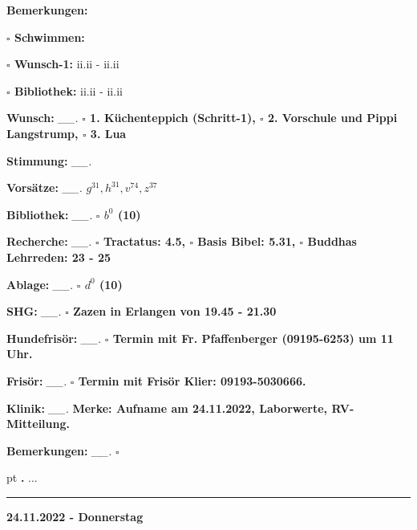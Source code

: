 \documentclass[10pt,a4paper]{article}
\newcounter{notec}
\newcommand\notep[1]{%
  \stepcounter{notec}
  \vskip #1pt
  {\bf\arabic{notec}.}
}
\newcommand\prop[1] {{\color {alizarin} {\bf #1}}}             %
\newcommand\opti[1] {{\color {amethyst} {\bf #1}}}             %
\newcommand\mand[1] {{\color {burntorange} {\bf #1}}}          %
\newcommand\ddivide {\vskip -9pt \hrule \vskip 6pt}
\newcommand\bottomspace{\vskip 4pt}
\newcommand\n[1] { {\sl #1.} \hskip 5pt }
\begin{document}
\begin{mdframed}[style=daystyle]
\begin{labeling}{{\mand {Bemerkungen:}}}
\begin{minipage}{0.75\textwidth}
\begin{labeling}{\prop {$\square$ {Schwimmen:}}}
      \item[{\prop {$\square$ Wunsch-1:}}]   ii.ii - ii.ii
      \item[{\prop {$\square$ Bibliothek:}}] ii.ii - ii.ii
      \end{labeling}
    \end{minipage}
    \bottomspace
  \item[{\mand {Wunsch:}}]       \n{\_\_} {\prop {$\square$ 1. Küchenteppich (Schritt-1),
      $\square$ 2. Vorschule und Pippi Langstrump, $\square$ 3. Lua}}
  \item[{\mand {Stimmung:}}]     \n{\_\_} %
  \item[{\mand {Vorsätze:}}]    \n{\_\_} {\prop {$g^{31}, h^{31}, v^{74}, z^{37}$}}
  \item[{\mand {Bibliothek:}}]   \n{\_\_} {\prop {$\square$ $b^{0}$ (10)}}
  \item[{\mand {Recherche:}}]    \n{\_\_} {\prop {$\square$ Tractatus: 4.5, $\square$ Basis Bibel: 5.31,
      $\square$ Buddhas Lehrreden: 23 - 25}}
  \item[{\mand {Ablage:}}]       \n{\_\_} {\prop {$\square$ $d^{0}$ (10)}}
  \item[{\mand {SHG:}}]          \n{\_\_} {\prop {$\square$ Zazen in Erlangen von 19.45 - 21.30}}
  \item[{\opti {Hundefrisör:}}]  \n{\_\_} {\prop {$\square$ Termin mit Fr. Pfaffenberger (09195-6253) um 11 Uhr.}}
  \item[{\opti {Frisör:}}]       \n{\_\_} {\prop {$\square$ Termin mit Frisör Klier: 09193-5030666.}}
  \item[{\opti {Klinik:}}]       \n{\_\_} {\prop {Merke: Aufname am 24.11.2022, Laborwerte, RV-Mitteilung.}}
  \item[{\mand {Bemerkungen:}}]  \n{\_\_} {\prop {$\square$}}
  \end{labeling}
    
  \setcounter{notec}{0}
  
  \notep 0 $\ldots$
\end{mdframed}


\ddivide
{\prop {24.11.2022 - Donnerstag}}
\end{document}
